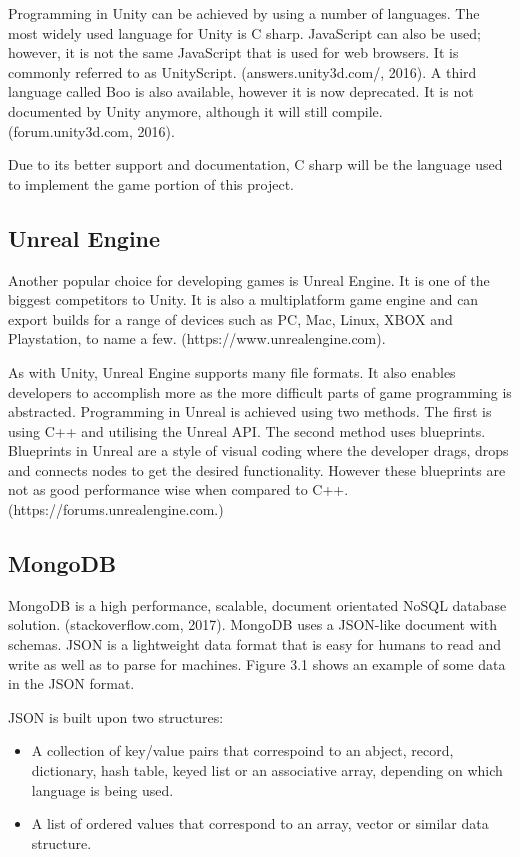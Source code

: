 \documentclass[12pt]{article}
\begin{document}
Programming in Unity can be achieved by using a number of languages. The most widely used language for Unity is C sharp. JavaScript can also be used; however, it is not the same JavaScript that is used for web browsers. It is commonly referred to as UnityScript. (answers.unity3d.com/, 2016). A third language called Boo is also available, however it is now deprecated. It is not documented by Unity anymore, although it will still compile. (forum.unity3d.com, 2016).

Due to its better support and documentation, C sharp will be the language used to implement the game portion of this project.


\begin{center}
\subsection{Unreal Engine}
\end{center}
Another popular choice for developing games is Unreal Engine. It is one of the biggest competitors to Unity. It is also a multiplatform game engine and can export builds for a range of devices such as PC, Mac, Linux, XBOX and Playstation, to name a few. (https://www.unrealengine.com).

As with Unity, Unreal Engine supports many file formats. It also enables developers to accomplish more as the more difficult parts of game programming is abstracted. Programming in Unreal is achieved using two methods. The first is using C++ and utilising the Unreal API. The second method uses blueprints. Blueprints in Unreal are a style of visual coding where the developer drags, drops and connects nodes to get the desired functionality. However these blueprints are not as good performance wise when compared to C++. (https://forums.unrealengine.com.) 

\begin{center}
\subsection{MongoDB}
\end{center}
MongoDB is a high performance, scalable, document orientated NoSQL database solution. (stackoverflow.com, 2017). MongoDB uses a JSON-like document with schemas. JSON is a lightweight data format that is easy for humans to read and write as well as to parse for machines. Figure 3.1 shows an example of some data in the JSON format.

JSON is built upon two structures: 
\begin{itemize}
	\item A collection of key/value pairs that correspoind to an abject, record, dictionary, hash table, keyed list or an associative array, depending on which language is being used.
	\item A list of ordered values that correspond to an array, vector or similar data structure. 
\end{itemize}
\end{document}
